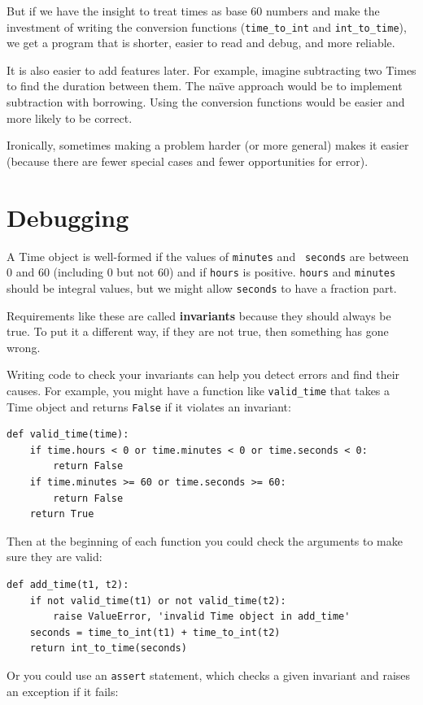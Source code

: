 \documentclass[10pt]{book}
\begin{document}
But if we have the insight to treat times as base 60 numbers and make
the investment of writing the conversion functions (\verb"time_to_int"
and \verb"int_to_time"), we get a program that is shorter, easier to
read and debug, and more reliable.

It is also easier to add features later.  For example, imagine
subtracting two Times to find the duration between them.  The
na\"{\i}ve approach would be to implement subtraction with borrowing.
Using the conversion functions would be easier and more likely to be
correct.


Ironically, sometimes making a problem harder (or more general) makes it
easier (because there are fewer special cases and fewer opportunities
for error).


\section{Debugging}

A Time object is well-formed if the values of {\tt minutes} and {\tt
seconds} are between 0 and 60 (including 0 but not 60) and if 
{\tt hours} is positive.  {\tt hours} and {\tt minutes} should be
integral values, but we might allow {\tt seconds} to have a
fraction part.


Requirements like these are called {\bf invariants} because
they should always be true.  To put it a different way, if they
are not true, then something has gone wrong.

Writing code to check your invariants can help you detect errors
and find their causes.  For example, you might have a function
like \verb"valid_time" that takes a Time object and returns
{\tt False} if it violates an invariant:

\beforeverb
\begin{verbatim}
def valid_time(time):
    if time.hours < 0 or time.minutes < 0 or time.seconds < 0:
        return False
    if time.minutes >= 60 or time.seconds >= 60:
        return False
    return True
\end{verbatim}
\afterverb
%
Then at the beginning of each function you could check the
arguments to make sure they are valid:


\beforeverb
\begin{verbatim}
def add_time(t1, t2):
    if not valid_time(t1) or not valid_time(t2):
        raise ValueError, 'invalid Time object in add_time'
    seconds = time_to_int(t1) + time_to_int(t2)
    return int_to_time(seconds)
\end{verbatim}
\afterverb
%
Or you could use an {\tt assert} statement, which checks a given invariant
and raises an exception if it fails:
\end{document}
